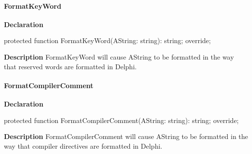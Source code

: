 \documentclass{report}
\newif\ifpdf
\begin{document}
\paragraph*{FormatKeyWord}\hspace*{\fill}

\label{PasDoc_GenHtml.TGenericHTMLDocGenerator-FormatKeyWord}
\begin{list}{}{
\setlength{\itemindent}{0cm}
\setlength{\listparindent}{0cm}
\setlength{\leftmargin}{\evensidemargin}
\addtolength{\leftmargin}{\tmplength}
\settowidth{\labelsep}{X}
\addtolength{\leftmargin}{\labelsep}
\setlength{\labelwidth}{\tmplength}
}
\item[\textbf{Declaration}\hfill]
\ifpdf
\begin{flushleft}
\fi
\begin{ttfamily}
protected function FormatKeyWord(AString: string): string; override;\end{ttfamily}

\ifpdf
\end{flushleft}
\fi

\par
\item[\textbf{Description}]
FormatKeyWord will cause AString to be formatted in the way that reserved words are formatted in Delphi.

\end{list}
\paragraph*{FormatCompilerComment}\hspace*{\fill}

\label{PasDoc_GenHtml.TGenericHTMLDocGenerator-FormatCompilerComment}
\begin{list}{}{
\setlength{\itemindent}{0cm}
\setlength{\listparindent}{0cm}
\setlength{\leftmargin}{\evensidemargin}
\addtolength{\leftmargin}{\tmplength}
\settowidth{\labelsep}{X}
\addtolength{\leftmargin}{\labelsep}
\setlength{\labelwidth}{\tmplength}
}
\item[\textbf{Declaration}\hfill]
\ifpdf
\begin{flushleft}
\fi
\begin{ttfamily}
protected function FormatCompilerComment(AString: string): string; override;\end{ttfamily}

\ifpdf
\end{flushleft}
\fi

\par
\item[\textbf{Description}]
FormatCompilerComment will cause AString to be formatted in the way that compiler directives are formatted in Delphi.

\end{list}
\end{document}
